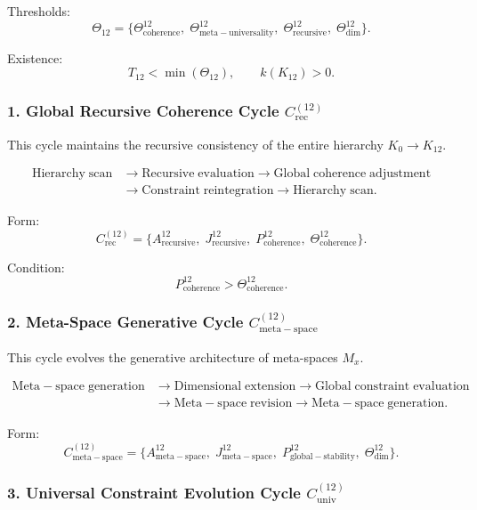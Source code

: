 Thresholds:
\[
  \Theta_{12}
  =
  \{
     \Theta^{12}_{\mathrm{coherence}},\;
     \Theta^{12}_{\mathrm{meta\!-\!universality}},\;
     \Theta^{12}_{\mathrm{recursive}},\;
     \Theta^{12}_{\mathrm{dim}}
  \}.
\]

Existence:
\[
  T_{12}<\min(\Theta_{12}),\qquad k(K_{12})>0.
\]


\subsubsection{1. Global Recursive Coherence Cycle $C_{\mathrm{rec}}^{(12)}$}

This cycle maintains the recursive consistency of the entire hierarchy
$K_0 \to K_{12}$.

\[
  \begin{aligned}
  \mathrm{Hierarchy\;scan}
  &\to \mathrm{Recursive\;evaluation}
  \to \mathrm{Global\;coherence\;adjustment}\\
  &\to \mathrm{Constraint\;reintegration}
  \to \mathrm{Hierarchy\;scan}.
  \end{aligned}
\]

Form:
\[
  C_{\mathrm{rec}}^{(12)}
  =
  \{
     A^{12}_{\mathrm{recursive}},\;
     J^{12}_{\mathrm{recursive}},\;
     P^{12}_{\mathrm{coherence}},\;
     \Theta^{12}_{\mathrm{coherence}}
  \}.
\]

Condition:
\[
   P^{12}_{\mathrm{coherence}}>\Theta^{12}_{\mathrm{coherence}}.
\]


\subsubsection{2. Meta-Space Generative Cycle $C_{\mathrm{meta\!-\!space}}^{(12)}$}

This cycle evolves the generative architecture of meta-spaces $M_x$.

\[
  \begin{aligned}
  \mathrm{Meta\!-\!space\;generation}
  &\to \mathrm{Dimensional\;extension}
  \to \mathrm{Global\;constraint\;evaluation}\\
  &\to \mathrm{Meta\!-\!space\;revision}
  \to \mathrm{Meta\!-\!space\;generation}.
  \end{aligned}
\]

Form:
\[
  C_{\mathrm{meta\!-\!space}}^{(12)}
  =
  \{
    A^{12}_{\mathrm{meta\!-\!space}},\;
    J^{12}_{\mathrm{meta\!-\!space}},\;
    P^{12}_{\mathrm{global\!-\!stability}},\;
    \Theta^{12}_{\mathrm{dim}}
  \}.
\]


\subsubsection{3. Universal Constraint Evolution Cycle $C_{\mathrm{univ}}^{(12)}$}

